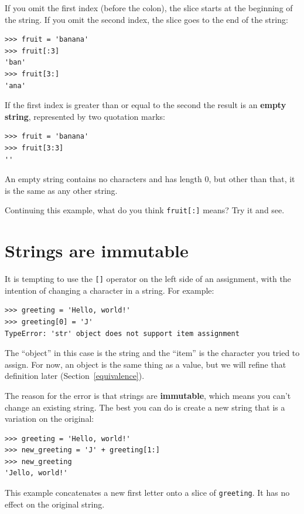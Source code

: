 \documentclass[10pt]{book}
\begin{document}
If you omit the first index (before the colon), the slice starts at
the beginning of the string.  If you omit the second index, the slice
goes to the end of the string:

\begin{verbatim}
>>> fruit = 'banana'
>>> fruit[:3]
'ban'
>>> fruit[3:]
'ana'
\end{verbatim}
%
If the first index is greater than or equal to the second the result
is an {\bf empty string}, represented by two quotation marks:

\begin{verbatim}
>>> fruit = 'banana'
>>> fruit[3:3]
''
\end{verbatim}
%
An empty string contains no characters and has length 0, but other
than that, it is the same as any other string.

Continuing this example, what do you think 
{\tt fruit[:]} means?  Try it and see.



\section{Strings are immutable}

It is tempting to use the {\tt []} operator on the left side of an
assignment, with the intention of changing a character in a string.
For example:

\begin{verbatim}
>>> greeting = 'Hello, world!'
>>> greeting[0] = 'J'
TypeError: 'str' object does not support item assignment
\end{verbatim}
%
The ``object'' in this case is the string and the ``item'' is
the character you tried to assign.  For now, an object is
the same thing as a value, but we will refine that definition
later (Section~\ref{equivalence}).  

The reason for the error is that
strings are {\bf immutable}, which means you can't change an
existing string.  The best you can do is create a new string
that is a variation on the original:

\begin{verbatim}
>>> greeting = 'Hello, world!'
>>> new_greeting = 'J' + greeting[1:]
>>> new_greeting
'Jello, world!'
\end{verbatim}
%
This example concatenates a new first letter onto
a slice of {\tt greeting}.  It has no effect on
the original string.
\end{document}
